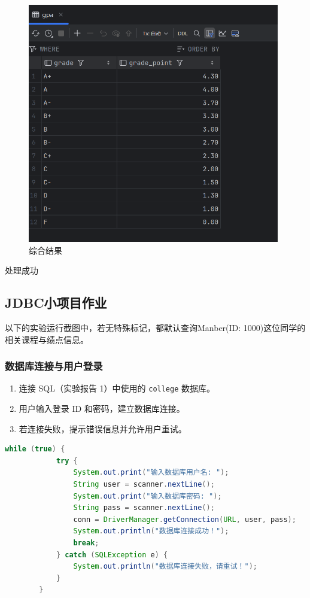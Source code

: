 \documentclass{article}
\begin{document}
	\begin{figure}[H]
		\centering
		\includegraphics[width=11cm]{./images/15.综合结果.png}
		\caption{综合结果}
	\end{figure}
	
	处理成功
	
	\subsection{JDBC小项目作业}
	
	\begin{tcolorbox}[title = {备注：}, colback = blue!25!white, colframe = blue!75!black]
		以下的实验运行截图中，若无特殊标记，都默认查询Manber(ID: 1000)这位同学的相关课程与绩点信息。
	\end{tcolorbox}
	
	\subsubsection{数据库连接与用户登录}
	\begin{enumerate}
		\item 连接 SQL（实验报告 1）中使用的 \texttt{college} 数据库。
		\item 用户输入登录 ID 和密码，建立数据库连接。
		\item 若连接失败，提示错误信息并允许用户重试。
	\end{enumerate}
	
	\begin{lstlisting}[language=java, title=连接数据库, tabsize=4]
		while (true) {
			try {
				System.out.print("输入数据库用户名: ");
				String user = scanner.nextLine();
				System.out.print("输入数据库密码: ");
				String pass = scanner.nextLine();
				conn = DriverManager.getConnection(URL, user, pass);
				System.out.println("数据库连接成功！");
				break;
			} catch (SQLException e) {
				System.out.println("数据库连接失败，请重试！");
			}
		}
	\end{lstlisting}
	
\end{document}
